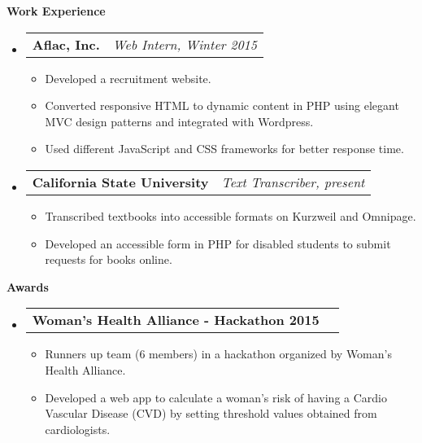 \documentclass[letterpaper,10pt]{article}
\makeatletter
\newcommand{\resitem}[1]{\item #1 \vspace{-2pt}}
\newcommand{\resheading}[1]{{\large \colorbox{mygrey}{\begin{minipage}{\textwidth}{\textbf{#1 \vphantom{p\^{E}}}}\end{minipage}}}}
\newcommand{\ressubheading}[4]{
\begin{tabular*}{7.0in}{l@{\extracolsep{\fill}}r}
		\textbf{#1} & \textit{#4} \\
\end{tabular*}\vspace{-6pt}}
\makeatother
\begin{document}
\resheading{Work Experience}

\begin{itemize}
\item
	\ressubheading{Aflac, Inc.}{Pasadena, CA}{Web Developer Intern}{Web  Intern, Winter 2015}
	\begin{itemize}
		\resitem{Developed a recruitment website.}
    \resitem{Converted responsive HTML to dynamic content in PHP using elegant MVC design patterns and integrated with Wordpress.}
    \resitem{Used different JavaScript and CSS frameworks for better response time.}
	\end{itemize}
    
\item
	\ressubheading{California State University}{Los Angeles, CA}{Text Transcriber}{Text Transcriber, present}
	\begin{itemize}
		\resitem{Transcribed textbooks into accessible formats on Kurzweil and Omnipage.}
    \resitem{Developed an accessible form in PHP for disabled students to submit requests for books online.}
	\end{itemize}


\end{itemize}

\resheading{Awards}

\begin{itemize}
\item
	\ressubheading{Woman's Health Alliance - Hackathon 2015}{Los Angeles, CA}{}{}
	\begin{itemize}
    \resitem{Runners up team (6 members) in a hackathon organized by Woman's Health Alliance.}
    \resitem{Developed a web app to calculate a woman's risk of having a Cardio Vascular Disease (CVD) by setting threshold values obtained from cardiologists.}
	\end{itemize}


\end{itemize}
\end{document}
